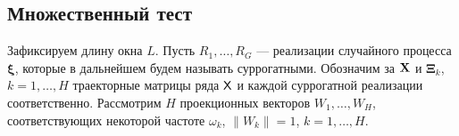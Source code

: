 \documentclass[specialist,
substylefile = spbu_report.rtx,
subf,href,colorlinks=true, 12pt]{disser}
\theoremstyle{definition}
\newtheorem{algorithm}{Алгоритм}
\newtheorem{remark}{Замечание}[section]
\begin{document}

\subsection{Множественный тест}\label{sect:multiple_test}
Зафиксируем длину окна $L$. Пусть $R_1, \ldots, R_G$ --- реализации случайного процесса $\bm\xi$, которые в дальнейшем будем называть суррогатными. Обозначим за $\mathbf{X}$ и $\bm\Xi_k$, $k=1,\ldots, H$ траекторные матрицы ряда $\mathsf{X}$ и каждой суррогатной реализации соответственно. Рассмотрим $H$ проекционных векторов $W_1,\ldots,W_H$, соответствующих некоторой частоте $\omega_k$, $\|W_k\|=1$, $k=1,\ldots,H$.
\end{document}
